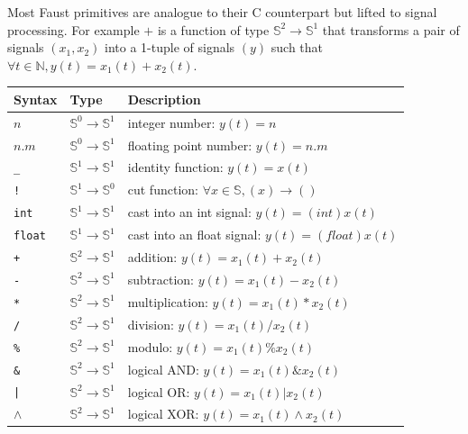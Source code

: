 \documentclass{article}
\begin{document}
Most Faust primitives are analogue to their C counterpart but lifted to signal processing.
For example $+$ is a function of type $\mathbb{S}^{2}\rightarrow\mathbb{S}^{1}$ that transforms a pair of signals $(x_1,x_2)$ into a 1-tuple of signals $(y)$ such that $\forall t\in\mathbb{N}, y(t)=x_{1}(t)+x_{2}(t)$.

\vspace{5 mm}

\begin{tabular}{|l|l|l|}
\hline
\textbf{Syntax} & \textbf{Type}  & \textbf{Description} \\
\hline
$n$ & $\mathbb{S}^{0}\rightarrow\mathbb{S}^{1}$ & integer number: $y(t)=n$ \\
$n.m$ & $\mathbb{S}^{0}\rightarrow\mathbb{S}^{1}$ & floating point number: $y(t)=n.m$ \\

\texttt{\_} & $\mathbb{S}^{1}\rightarrow\mathbb{S}^{1}$ & identity function: $y(t)=x(t)$ \\
\texttt{!} & $\mathbb{S}^{1}\rightarrow\mathbb{S}^{0}$ & cut function: $\forall x\in\mathbb{S},(x)\rightarrow ()$\\

\texttt{int} & $\mathbb{S}^{1}\rightarrow\mathbb{S}^{1}$ & cast into an int signal: $y(t)=(int)x(t)$  \\
\texttt{float} & $\mathbb{S}^{1}\rightarrow\mathbb{S}^{1}$ & cast into an float signal: $y(t)=(float)x(t)$  \\

\texttt{+} & $\mathbb{S}^{2}\rightarrow\mathbb{S}^{1}$ & addition: $y(t)=x_{1}(t)+x_{2}(t)$  \\
\texttt{-} & $\mathbb{S}^{2}\rightarrow\mathbb{S}^{1}$ & subtraction: $y(t)=x_{1}(t)-x_{2}(t)$   \\
\texttt{*} & $\mathbb{S}^{2}\rightarrow\mathbb{S}^{1}$ & multiplication: $y(t)=x_{1}(t)*x_{2}(t)$   \\
\texttt{/} & $\mathbb{S}^{2}\rightarrow\mathbb{S}^{1}$ & division: $y(t)=x_{1}(t)/x_{2}(t)$   \\
\texttt{\%} & $\mathbb{S}^{2}\rightarrow\mathbb{S}^{1}$ & modulo: $y(t)=x_{1}(t)\%x_{2}(t)$   \\

\texttt{\&} & $\mathbb{S}^{2}\rightarrow\mathbb{S}^{1}$ & logical AND: $y(t)=x_{1}(t)\&x_{2}(t)$   \\
\texttt{|} & $\mathbb{S}^{2}\rightarrow\mathbb{S}^{1}$ & logical OR: $y(t)=x_{1}(t)|x_{2}(t)$   \\
\texttt{$\land$} & $\mathbb{S}^{2}\rightarrow\mathbb{S}^{1}$ & logical XOR: $y(t)=x_{1}(t)\land x_{2}(t)$   \\


\end{tabular}
\end{document}
